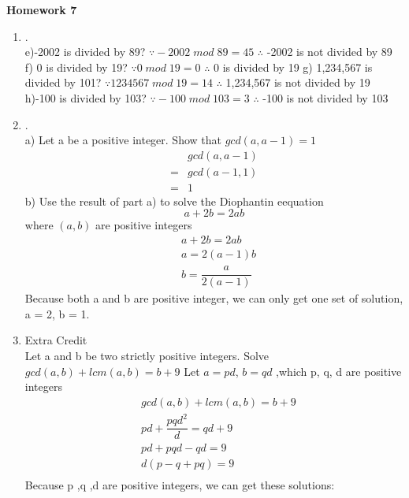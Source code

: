 \documentclass{article}
\theoremstyle{definition}
\theoremstyle{plain}
\begin{document}
\begin{center} \bf \LARGE Homework 7\\
\end{center}


\begin {enumerate}[itemindent=30pt,label=\bf Exercise {\arabic*}:]
\item .\\
\subitem e)-2002 is divided by 89?
\subitem \qquad $\because -2002\;mod\;89 = 45$
\subitem \qquad $\therefore$ -2002 is not divided by 89
\subitem f) 0 is divided by 19?
\subitem \qquad $\because 0\;mod\;19 = 0$
\subitem \qquad $\therefore$ 0 is divided by 19
\subitem g) 1,234,567 is divided by 101?
\subitem \qquad $\because 1234567\;mod\;19 = 14$
\subitem \qquad $\therefore$ 1,234,567 is not divided by 19
\subitem h)-100 is divided by 103?
\subitem \qquad $\because -100\;mod\;103 = 3$
\subitem \qquad $\therefore$ -100 is not divided by 103
\item .\\
\subitem a) Let a be a positive integer. Show that $gcd(a,a-1) = 1$
\begin{align*}
	 &gcd(a, a-1) \\
    =&gcd(a-1, 1) \\
    =&1
\end{align*}
\subitem b) Use the result of part a) to solve the Diophantin eequation $$a+2b=2ab$$\qquad \qquad  where $(a,b)$ are positive integers
\begin{align*}
	& a+2b = 2ab\\
	& a = 2(a-1)b\\
	& b = \dfrac{a}{2(a-1)}
\end{align*}
\subitem \qquad Because both a and b are positive integer, we can only get one set of solution, a = 2, b = 1. 
\item Extra Credit\\ Let a and b be two strictly positive integers. Solve $gcd(a,b)+lcm(a,b) = b + 9$
\subitem Let $a = pd$, $b = qd$ ,which p, q, d are positive integers
\begin{align*}
	& gcd(a,b)+lcm(a,b) = b + 9 \\
	& pd + \dfrac{pqd^2}{d} = qd + 9\\
	& pd + pqd - qd = 9\\
	& d(p - q + pq) = 9\\
\end{align*}
\subitem Because p ,q ,d are positive integers, we can get these solutions:\\
\begin{tabularx}{300pt}{XXX} 

\end{tabularx}
\end{enumerate}
\end{document}

